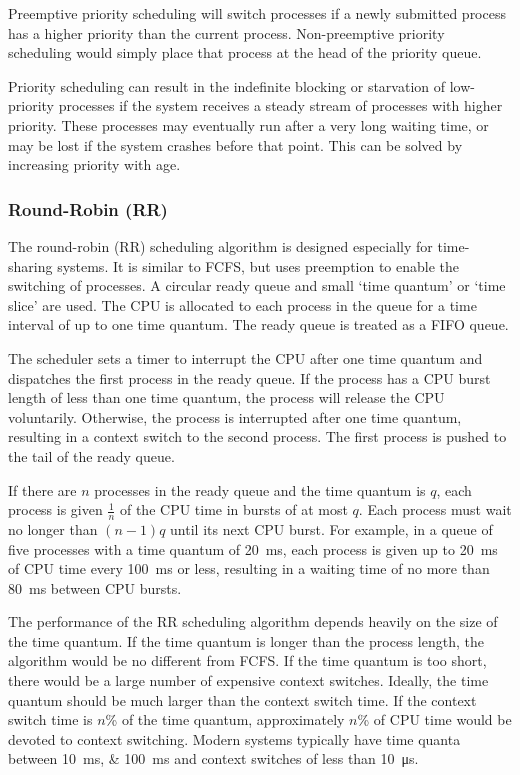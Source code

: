 Preemptive priority scheduling will switch processes if a newly submitted process has a higher priority than the current process.
Non-preemptive priority scheduling would simply place that process at the head of the priority queue.

Priority scheduling can result in the indefinite blocking or starvation of low-priority processes if the system receives a steady stream of processes with higher priority.
These processes may eventually run after a very long waiting time, or may be lost if the system crashes before that point.
\newline
This can be solved by increasing priority with age.

\subsubsection{Round-Robin (RR)}

The round-robin (RR) scheduling algorithm is designed especially for time-sharing systems.
It is similar to FCFS, but uses preemption to enable the switching of processes.
A circular ready queue and small `time quantum' or `time slice' are used.
The CPU is allocated to each process in the queue for a time interval of up to one time quantum.
The ready queue is treated as a FIFO queue.

The scheduler sets a timer to interrupt the CPU after one time quantum and dispatches the first process in the ready queue.
If the process has a CPU burst length of less than one time quantum, the process will release the CPU voluntarily.
Otherwise, the process is interrupted after one time quantum, resulting in a context switch to the second process.
The first process is pushed to the tail of the ready queue.

If there are \( n \) processes in the ready queue and the time quantum is \( q \), each process is given \( \frac{1}{n} \) of the CPU time in bursts of at most \( q \).
Each process must wait no longer than \( \left( n - 1 \right) q \) until its next CPU burst.
For example, in a queue of five processes with a time quantum of \SI{20}{\milli\second}, each process is given up to \SI{20}{\milli\second} of CPU time every \SI{100}{\milli\second} or less, resulting in a waiting time of no more than \SI{80}{\milli\second} between CPU bursts.

The performance of the RR scheduling algorithm depends heavily on the size of the time quantum.
If the time quantum is longer than the process length, the algorithm would be no different from FCFS\@.
If the time quantum is too short, there would be a large number of expensive context switches.
Ideally, the time quantum should be much larger than the context switch time.
If the context switch time is \( n \)\si{\percent} of the time quantum, approximately \( n \)\si{\percent} of CPU time would be devoted to context switching.
Modern systems typically have time quanta between \SIlist{10;100}{\milli\second} and context switches of less than \SI{10}{\micro\second}.


